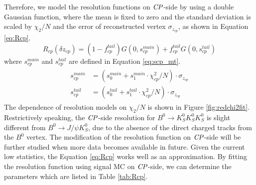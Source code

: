 Therefore, we model the resolution functions on $\it{CP}$-side by using a double Gaussian function, where the mean is fixed to zero and the standard deviation is scaled by $\chi_2/N$ and the error of reconstructed vertex $\sigma_{z_{cp}}$, as shown in Equation \ref{eq:Rcp}.
\begin{equation}\label{eq:Rcp}
R_{cp}(\delta z_{cp}) = (1-f_{cp}^{tail})G(0,s_{cp}^{main})+
f_{cp}^{tail}G(0,s_{cp}^{tail})
\end{equation} where $s_{cp}^{main}$ and $s_{cp}^{tail}$ are defined in Equation \ref{eq:scp_mt}.
\begin{eqnarray}\label{eq:scp_mt}
\begin{split}
s_{cp}^{main}&=(s_0^{main} + s_1^{main}\cdot \chi^2_{cp}/N )\cdot \sigma_{z_{cp}}\\
s_{cp}^{tail}&=(s_0^{tail} + s_1^{tail}\cdot \chi^2_{cp}/N )\cdot \sigma_{z_{cp}}
\end{split}
\end{eqnarray} 
The dependence of resolution models on $\chi_2/N$ is shown in Figure \ref{fig:redchi2fit}. Restrictively speaking, the $\it{CP}$-side resolution for $B^0 \to K_S^0  K_S^0  K_S^0$ is slight different from $B^0\to J/\psi K_S^0$, due to the absence of the direct charged tracks from the $B^0$ vertex. The modification of the resolution function on $\it{CP}$-side will be further studied when more data becomes available in future. Given the current low statistics, the Equation \ref{eq:Rcp} works well as an approximation. By fitting the resolution function using signal MC on $\it{CP}$-side, we can determine the parameters which are listed in Table \ref{tab:Rcp}.
